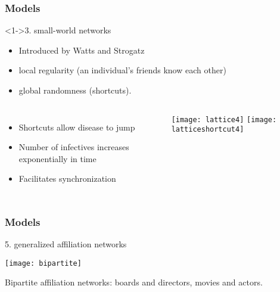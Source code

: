 \begin{frame}
  \frametitle{Models}

  \begin{block}<1->{3. small-world networks}
    \begin{itemize}
    \item Introduced by Watts and Strogatz\cite{watts1998a}
    \end{itemize}
    \medskip
    \begin{itemize}
    \item<3-> \alert{local regularity} (an individual's friends know each other)
    \item<4-> \alert{global randomness} (shortcuts).
    \end{itemize}

    \begin{columns}
      \begin{itemize}
      \item<5-> Shortcuts allow disease to jump
      \item<6-> Number of infectives increases exponentially in time
      \item<7-> Facilitates synchronization
      \end{itemize}
      \begin{overprint}
        \texttt{[image: lattice4]}
        \texttt{[image: latticeshortcut4]}
      \end{overprint}
    \end{columns}
  \end{block}
  
\end{frame}

\begin{frame}
  \showtarotcards{0.35}{
    john-dory,
    overview,
    complex-networks,
    random-networks,
    scale-free-networks,
    small-world-networks,
    theory-six-degrees,
}
\end{frame}

\begin{frame}
  \frametitle{Models}

  \begin{block}{5. generalized affiliation networks}
    \bigskip
    \begin{center}
      \texttt{[image: bipartite]}
    \end{center}
  \end{block}

  Bipartite affiliation networks: boards and directors, movies and actors.

\end{frame}

